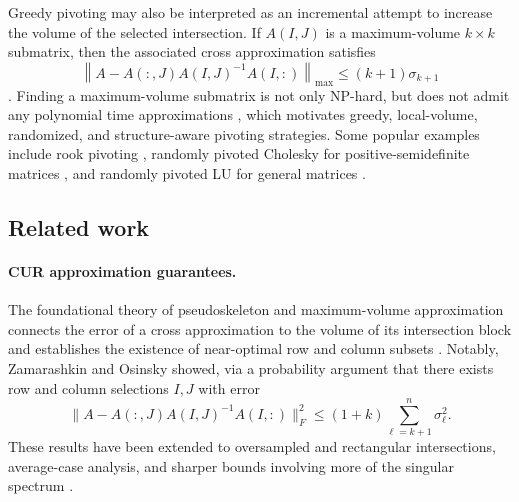 \documentclass[11pt, preprint]{article}
\begin{document}
Greedy pivoting may also be interpreted as an incremental attempt to increase
the volume of the selected intersection. If $A(I,J)$ is a maximum-volume
$k\times k$ submatrix, then the associated cross approximation satisfies
\[
    \left\|
    A-A(:,J)A(I,J)^{-1}A(I,:)
    \right\|_{\max}
    \leq
    (k+1)\sigma_{k+1}
\]
\cite{GoreinovMaximalVolumeConcept}. Finding a maximum-volume submatrix is
not only NP-hard, but does not admit any polynomial time approximations  \cite{Civril_SelectingMaximumVolume2009}, which motivates greedy,
local-volume, randomized, and structure-aware pivoting strategies. Some popular examples
include rook pivoting \cite{Foster_GrowthFactorEfficiency1997}, randomly
pivoted Cholesky for positive-semidefinite matrices
\cite{Chen_RandomlyPivotedCholesky2025}, and randomly pivoted LU for general
matrices \cite{Gilles_LowRankApproximationRandomly2026}.

 
\subsection{Related work}

\paragraph{CUR approximation guarantees.}
The foundational theory of pseudoskeleton and maximum-volume approximation
connects the error of a cross approximation to the volume of its intersection
block and establishes the existence of near-optimal row and column subsets
\cite{Goreinov_TheoryPseudoskeletonApproximations1997,
Zamarashkin_ExistenceNearlyOptimal2018}. Notably, Zamarashkin and Osinsky showed, via a probability argument that there exists row and column selections $I,J$ with error \[
\|A-A(:,J)A(I,J)^{-1}A(I,:)\|_F^2 \leq (1+k)\sum_{\ell=k+1}^n \sigma_{\ell}^2.
\]
These results have been extended to
oversampled and rectangular intersections, average-case analysis, and sharper
bounds involving more of the singular spectrum
\cite{Osinsky_Zamarashkin_Pseudoskeleton2018,
Mikhalev_RectangularMaxvol2018,
Zamarashkin_Osinsky_MaxvolAverage2021,
DeHoog_Hegland_Pseudoskeleton2023,
Osinsky_CloseOptimalCross2025}.
\end{document}
